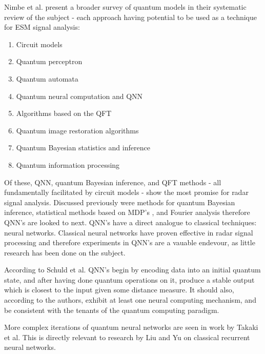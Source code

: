 Nimbe et al. \cite{nimbe_models_2021} present a broader survey of quantum models in their systematic review of the subject - each approach having potential to be used as a technique for \ac{ESM} signal analysis:
\begin{enumerate}
    \item Circuit models
    \item Quantum perceptron
    \item Quantum automata
    \item Quantum neural computation and \ac{QNN}
    \item Algorithms based on the \ac{QFT}
    \item Quantum image restoration algorithms 
    \item Quantum Bayesian statistics and inference
    \item Quantum information processing
\end{enumerate}

Of these, \ac{QNN}, quantum Bayesian inference, and \ac{QFT} methods - all fundamentally facilitated by circuit models - show the most promise for radar signal analysis.
Discussed previously were methods for quantum Bayesian inference, statistical methods based on \ac{MDP}'s \cite{barry_quantum_2014}, and Fourier analysis \cite{hoyer_efficient_1997, fijany_quantum_1998} therefore \ac{QNN}'s are looked to next.
\ac{QNN}'s have a direct analogue to classical techniques: neural networks.
Classical neural networks have proven effective in radar signal processing \cite{noone_neural_1999, haykin_cognitive_2006, mason_deep_2017, liu_classification_2019} and therefore experiments in \ac{QNN}'s are a vauable endevour, as little research has been done on the subject.

According to Schuld et al. \cite{schuld_quest_2014} \ac{QNN}'s begin by encoding data into an initial quantum state, and after having done quantum operations on it, produce a stable output which is closest to the input given some distance measure.
It should also, according to the authors, exhibit at least one neural computing mechanism, and be consistent with the tenants of the quantum computing paradigm.

More complex iterations of quantum neural networks are seen in work by Takaki et al. \cite{takaki_learning_2021}
This is directly relevant to research by Liu and Yu \cite{liu_classification_2019} on classical recurrent neural networks.

